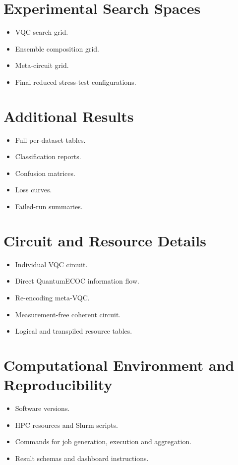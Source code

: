\documentclass[]{UCD_CS_MSc_AAI_Report}
\begin{document}
\chapter{Experimental Search Spaces}
\label{app:search-spaces}
\begin{itemize}
    \item VQC search grid.
    \item Ensemble composition grid.
    \item Meta-circuit grid.
    \item Final reduced stress-test configurations.
\end{itemize}

\chapter{Additional Results}
\label{app:additional-results}
\begin{itemize}
    \item Full per-dataset tables.
    \item Classification reports.
    \item Confusion matrices.
    \item Loss curves.
    \item Failed-run summaries.
\end{itemize}

\chapter{Circuit and Resource Details}
\label{app:circuits}
\begin{itemize}
    \item Individual VQC circuit.
    \item Direct QuantumECOC information flow.
    \item Re-encoding meta-VQC.
    \item Measurement-free coherent circuit.
    \item Logical and transpiled resource tables.
\end{itemize}

\chapter{Computational Environment and Reproducibility}
\label{app:reproducibility}
\begin{itemize}
    \item Software versions.
    \item HPC resources and Slurm scripts.
    \item Commands for job generation, execution and aggregation.
    \item Result schemas and dashboard instructions.
\end{itemize}
\end{document}
